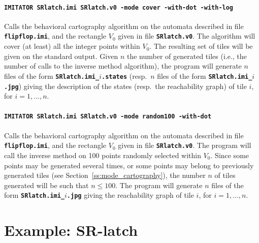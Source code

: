\documentclass[a4paper,11pt]{article}
\newcommand{\imitatorExec}{\code{IMITATOR}}
\newcommand{\code}[1]{\textbf{\texttt{#1}}}
\begin{document}
\paragraph{\code{\imitatorExec{} SRlatch.imi SRlatch.v0 -mode cover -with-dot -with-log}}
Calls the behavioral cartography algorithm on the automata described in file \code{flipflop.imi}, and the rectangle $V_0$ given in file \code{SRlatch.v0}.
The algorithm will cover (at least) all the integer points within $V_0$.
The resulting set of tiles will be given on the standard output.
Given $n$ the number of generated tiles (i.e., the number of calls to the inverse method algorithm), the program will generate $n$ files of the form \code{SRlatch.imi\_$i$.states} (resp.~$n$ files of the form \code{SRlatch.imi\_$i$.jpg}) giving the description of the states (resp.~the reachability graph) of tile $i$, for $i = 1, \dots, n$.


\paragraph{\code{\imitatorExec{} SRlatch.imi SRlatch.v0 -mode random100 -with-dot}}
Calls the behavioral cartography algorithm on the automata described in file \code{flipflop.imi}, and the rectangle $V_0$ given in file \code{SRlatch.v0}.
The program will call the inverse method on 100 points randomly selected within $V_0$.
Since some points may be generated several times, or some points may belong to previously generated tiles (see Section~\ref{ss:mode_cartography}), the number $n$ of tiles generated will be such that $n \leq 100$.
The program will generate $n$ files of the form \code{SRlatch.imi\_$i$.jpg} giving the reachability graph of tile $i$, for $i = 1, \dots, n$.



\section{Example: SR-latch} \label{sec:example}
\end{document}
